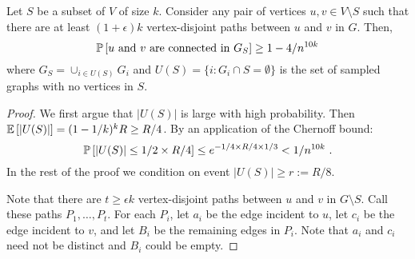
\begin{theorem}\label{thm:everyonesgonetosleep}
Let $S$ be a subset of $V$ of size $k$. Consider any pair of vertices $u,v\in V\setminus S$ such that there are at least $(1+\epsilon)k$ vertex-disjoint paths between $u$ and $v$ in $G$. Then, 
\[\mathbb P \left [ u \mbox{ and }v \mbox{ are connected in } G_S \right ]\geq 1-4/n^{10k}\] 
where $G_S=\cup_{i\in U(S)} G_i$ and $U(S)=\{i:G_i\cap S=\emptyset\}$ is the set of sampled graphs with no vertices in $S$. 
\end{theorem}
\begin{proof}
We first argue that $|U(S)|$ is large with high probability. Then $\mathbb E\left [ |U(S)| \right ]=(1-1/k)^{k} R \geq R/4$. By an application of the Chernoff bound:
\[
\mathbb P \left [ |U(S)|\leq 1/2\times R/4 \right ]\leq  e^{-1/4\times R/4 \times 1/3}<1/n^{10k} \ .
\]
In the rest of the proof we condition on event $|U(S)|\geq r:=R/8$.

Note that there are $t\geq \epsilon k$ vertex-disjoint paths between $u$ and $v$ in $G\setminus S$. Call these paths $P_1, \ldots, P_{t}$. For each $P_i$, let $a_i$ be the edge incident to $u$, let $c_i$ be the edge incident to $v$, and let $B_i$ be the remaining edges in $P_i$. Note that $a_i$ and $c_i$ need not be distinct and $B_i$ could be empty.


\end{proof}
